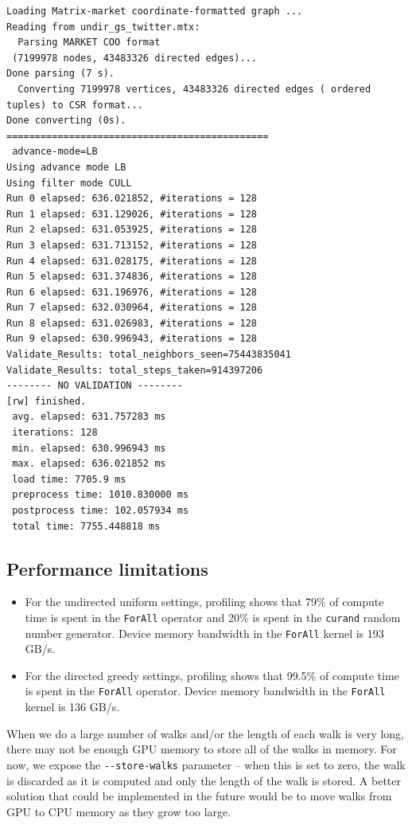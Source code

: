 \documentclass[10pt,oneside]{memoir}
\providecommand{\tightlist}{%
  \setlength{\itemsep}{0pt}\setlength{\parskip}{0pt}}
\begin{document}
\begin{verbatim}
Loading Matrix-market coordinate-formatted graph ...
Reading from undir_gs_twitter.mtx:
  Parsing MARKET COO format
 (7199978 nodes, 43483326 directed edges)...
Done parsing (7 s).
  Converting 7199978 vertices, 43483326 directed edges ( ordered tuples) to CSR format...
Done converting (0s).
==============================================
 advance-mode=LB
Using advance mode LB
Using filter mode CULL
Run 0 elapsed: 636.021852, #iterations = 128
Run 1 elapsed: 631.129026, #iterations = 128
Run 2 elapsed: 631.053925, #iterations = 128
Run 3 elapsed: 631.713152, #iterations = 128
Run 4 elapsed: 631.028175, #iterations = 128
Run 5 elapsed: 631.374836, #iterations = 128
Run 6 elapsed: 631.196976, #iterations = 128
Run 7 elapsed: 632.030964, #iterations = 128
Run 8 elapsed: 631.026983, #iterations = 128
Run 9 elapsed: 630.996943, #iterations = 128
Validate_Results: total_neighbors_seen=75443835041
Validate_Results: total_steps_taken=914397206
-------- NO VALIDATION --------
[rw] finished.
 avg. elapsed: 631.757283 ms
 iterations: 128
 min. elapsed: 630.996943 ms
 max. elapsed: 636.021852 ms
 load time: 7705.9 ms
 preprocess time: 1010.830000 ms
 postprocess time: 102.057934 ms
 total time: 7755.448818 ms
\end{verbatim}

\hypertarget{performance-limitations-3}{%
\subsection{Performance limitations}\label{performance-limitations-3}}

\begin{itemize}
\tightlist
\item
  For the undirected uniform settings, profiling shows that 79\% of
  compute time is spent in the \texttt{ForAll} operator and 20\% is
  spent in the \texttt{curand} random number generator. Device memory
  bandwidth in the \texttt{ForAll} kernel is 193 GB/s.
\item
  For the directed greedy settings, profiling shows that 99.5\% of
  compute time is spent in the \texttt{ForAll} operator. Device memory
  bandwidth in the \texttt{ForAll} kernel is 136 GB/s.
\end{itemize}

When we do a large number of walks and/or the length of each walk is
very long, there may not be enough GPU memory to store all of the walks
in memory. For now, we expose the \texttt{-\/-store-walks} parameter --
when this is set to zero, the walk is discarded as it is computed and
only the length of the walk is stored. A better solution that could be
implemented in the future would be to move walks from GPU to CPU memory
as they grow too large.
\end{document}
